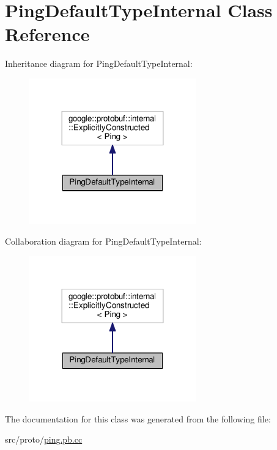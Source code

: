 \hypertarget{class_ping_default_type_internal}{}\section{Ping\+Default\+Type\+Internal Class Reference}
\label{class_ping_default_type_internal}


Inheritance diagram for Ping\+Default\+Type\+Internal\+:\nopagebreak
\begin{figure}[H]
\begin{center}
\leavevmode
\includegraphics[width=204pt]{class_ping_default_type_internal__inherit__graph}
\end{center}
\end{figure}


Collaboration diagram for Ping\+Default\+Type\+Internal\+:\nopagebreak
\begin{figure}[H]
\begin{center}
\leavevmode
\includegraphics[width=204pt]{class_ping_default_type_internal__coll__graph}
\end{center}
\end{figure}


The documentation for this class was generated from the following file\+:\begin{DoxyCompactItemize}
\item 
src/proto/\hyperlink{ping_8pb_8cc}{ping.\+pb.\+cc}\end{DoxyCompactItemize}
